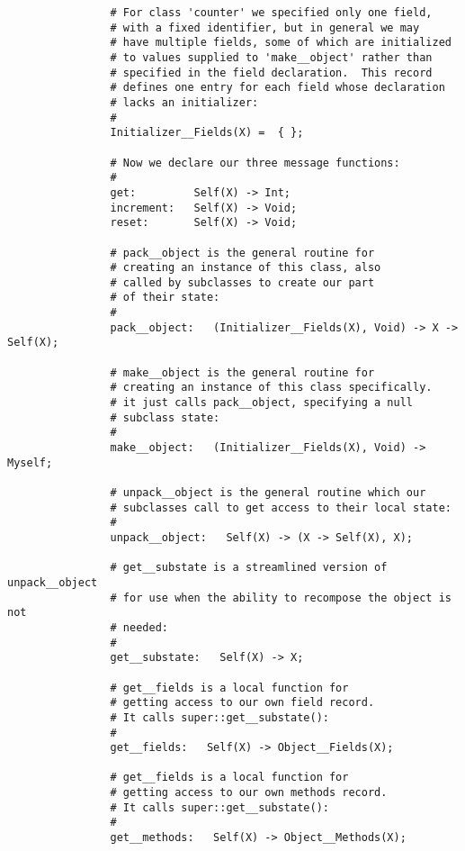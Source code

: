 \begin{verbatim}
                # For class 'counter' we specified only one field,
                # with a fixed identifier, but in general we may
                # have multiple fields, some of which are initialized
                # to values supplied to 'make__object' rather than
                # specified in the field declaration.  This record
                # defines one entry for each field whose declaration
                # lacks an initializer:
                #
                Initializer__Fields(X) =  { };

                # Now we declare our three message functions:
                #
                get:         Self(X) -> Int; 
                increment:   Self(X) -> Void; 
                reset:       Self(X) -> Void; 

                # pack__object is the general routine for
                # creating an instance of this class, also
                # called by subclasses to create our part
                # of their state:
                # 
                pack__object:   (Initializer__Fields(X), Void) -> X -> Self(X); 

                # make__object is the general routine for
                # creating an instance of this class specifically.
                # it just calls pack__object, specifying a null
                # subclass state:
                #
                make__object:   (Initializer__Fields(X), Void) -> Myself; 

                # unpack__object is the general routine which our
                # subclasses call to get access to their local state:
                #
                unpack__object:   Self(X) -> (X -> Self(X), X); 

                # get__substate is a streamlined version of unpack__object
                # for use when the ability to recompose the object is not
                # needed:
                #
                get__substate:   Self(X) -> X; 

                # get__fields is a local function for
                # getting access to our own field record.
                # It calls super::get__substate():
                #
                get__fields:   Self(X) -> Object__Fields(X); 

                # get__fields is a local function for
                # getting access to our own methods record.
                # It calls super::get__substate():
                #
                get__methods:   Self(X) -> Object__Methods(X); 


\end{verbatim}

